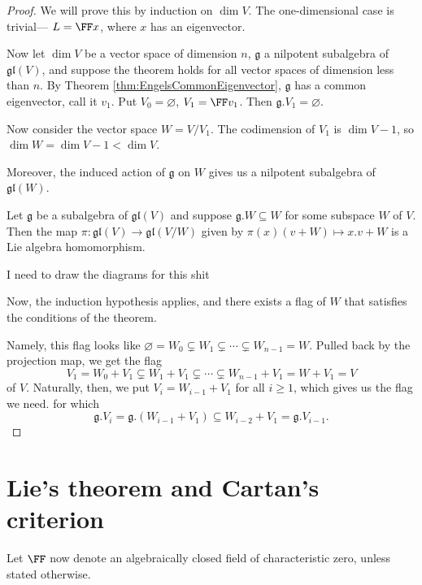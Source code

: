 \documentclass{article}
\newcommand*\frkg{{\ensuremath{\mathfrak{g}}}}
\newcommand*\gl{\ensuremath{\mathfrak{gl}}}
\newcommand*\acts{.}
\begin{document}
\begin{proof}
    We will prove this by induction on $\dim V$.
    The one-dimensional case is trivial--- $L = \FF x$, where $x$ has an eigenvector.

    Now let $\dim V$ be a vector space of dimension $n$, $\frkg$ a nilpotent subalgebra of $\gl(V)$, and suppose the theorem holds for all vector spaces of dimension less than $n$.
    By Theorem \ref{thm:EngelsCommonEigenvector}, $\frkg$ has a common eigenvector, call it $v_1$.
    Put $V_0 = \varnothing$, $V_1 = \FF v_1$.
    Then $\frkg \acts V_1 = \varnothing$.

    Now consider the vector space $W = V/V_1$.
    The codimension of $V_1$ is $\dim V - 1$, so $\dim W = \dim V - 1 < \dim V$.

    Moreover, the induced action of $\frkg$ on $W$ gives us a nilpotent subalgebra of $\gl(W)$. 


    Let $\frkg$ be a subalgebra of $\gl(V)$ and suppose $\frkg.W \subseteq W$ for some subspace $W$ of $V$.
    Then the map $\pi: \gl(V) \to \gl(V/W)$ given by $\pi(x)(v + W) \mapsto x \acts v + W$ is a Lie algebra homomorphism.

    I need to draw the diagrams for this shit

    Now, the induction hypothesis applies, and there exists a flag of $W$ that satisfies the conditions of the theorem.

    Namely, this flag looks like $\varnothing = W_0 \subsetneq W_1 \subsetneq \cdots \subsetneq W_{n-1} = W$.
    Pulled back by the projection map, we get the flag
    \[
        V_1 = W_0 + V_1 \subsetneq W_1 + V_1 \subsetneq \cdots \subsetneq W_{n-1} + V_1 = W + V_1 = V
    \]
    of $V$.
    Naturally, then, we put $V_i = W_{i-1} + V_1$ for all $i \geq 1$, which gives us the flag we need.
    for which
    \[
        \frkg.V_i
        =
        \frkg.(W_{i-1} + V_1) 
        \subseteq
        W_{i-2} + V_1
        =
        \frkg.V_{i-1}.
    \]

\end{proof}

\section{
Lie's theorem and Cartan's criterion 
\texorpdfstring{\cite[\S 4]{Hum72}}{[Hum.\S 4]}
}

\begin{convention}
    Let $\FF$ now denote an algebraically closed field of characteristic zero, unless stated otherwise.
\end{convention}
\end{document}
